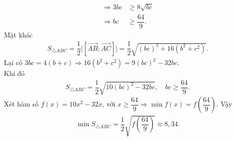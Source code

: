 \begin{bt}
{\begin{align*}
			\Rightarrow 3bc  &\ge 8\sqrt{bc} \\
			\Rightarrow  bc &\ge \dfrac{64}{9}.
		\end{align*}
		Mặt  khác
		\begin{align*}
			S_{\triangle ABC}  =\dfrac{1}{2}\bigg|\left[\overrightarrow{AB}; \overrightarrow{AC} \right]\bigg|
			 = \dfrac{1}{2}\sqrt{(bc)^2 + 16(b^2 + c^2)}.
		\end{align*}
		Lại có $3bc = 4(b + c) \Rightarrow 16(b^2 + c^2) = 9(bc)^2 - 32bc$.\\ 
		 Khi đó
		\begin{align*}
			S_{\triangle ABC} = \dfrac{1}{2}\sqrt{10(bc)^2 -  32bc}, \quad bc \ge \dfrac{64}{9}.
		\end{align*}
		Xét hàm số $f(x) = 10x^2 - 32x$, với $x \ge \dfrac{64}{9} \Rightarrow \min f(x) = f\left(\dfrac{64}{9}\right)$. 
		 Vậy
		\begin{align*}
			\min S_{\triangle ABC} = \dfrac{1}{2}\sqrt{f\!\left(\dfrac{64}{9}\right)} \approx 8{,}34. 
		\end{align*}
	} 
\end{bt}

